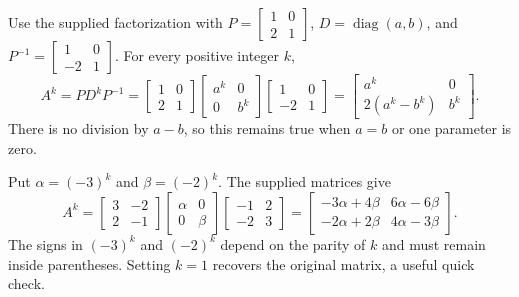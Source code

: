 Use the supplied factorization with $P=\left[\begin{smallmatrix}1&0\\2&1\end{smallmatrix}\right]$, $D=\operatorname{diag}(a,b)$, and $P^{-1}=\left[\begin{smallmatrix}1&0\\-2&1\end{smallmatrix}\right]$. For every positive integer $k$,
\[
A^k=PD^kP^{-1}
=\begin{bmatrix}1&0\\2&1\end{bmatrix}
\begin{bmatrix}a^k&0\\0&b^k\end{bmatrix}
\begin{bmatrix}1&0\\-2&1\end{bmatrix}
=\begin{bmatrix}a^k&0\\2(a^k-b^k)&b^k\end{bmatrix}.
\]
There is no division by $a-b$, so this remains true when $a=b$ or one parameter is zero.

Put $\alpha=(-3)^k$ and $\beta=(-2)^k$. The supplied matrices give
\[
A^k=\begin{bmatrix}3&-2\\2&-1\end{bmatrix}
\begin{bmatrix}\alpha&0\\0&\beta\end{bmatrix}
\begin{bmatrix}-1&2\\-2&3\end{bmatrix}
=\begin{bmatrix}-3\alpha+4\beta&6\alpha-6\beta\\-2\alpha+2\beta&4\alpha-3\beta\end{bmatrix}.
\]
The signs in $(-3)^k$ and $(-2)^k$ depend on the parity of $k$ and must remain inside parentheses. Setting $k=1$ recovers the original matrix, a useful quick check.

